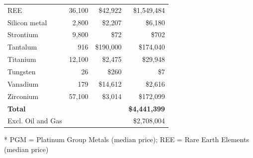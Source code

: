 \documentclass{adonis}
\begin{document}
\begin{table}[H]
\begin{threeparttable}
\begin{tabular}{@{}l@{\hskip 6pt}r@{\hskip 6pt}r@{\hskip 6pt}r@{}}
REE\tnote{*}       & 36,100                 & \$42,922         & \$1,549,484 \\
Silicon metal      & 2,800                  & \$2,207          & \$6,180 \\
Strontium          & 9,800                  & \$72             & \$702 \\
Tantalum           & 916                    & \$190,000        & \$174,040 \\
Titanium           & 12,100                 & \$2,475          & \$29,948 \\
Tungsten           & 26                     & \$260            & \$7 \\
Vanadium           & 179                    & \$14,612         & \$2,616 \\
Zirconium          & 57,100                 & \$3,014          & \$172,099 \\
\midrule
\textbf{Total}     &                        &                  & \textbf{\$4,441,399} \\
Excl. Oil and Gas  &                        &                  & \$2,708,004 \\
\bottomrule
\end{tabular}
\begin{tablenotes}
\footnotesize
\item[*] PGM = Platinum Group Metals (median price); REE = Rare Earth Elements (median price)\\
\end{tablenotes}
\end{threeparttable}
\end{table}
\end{document}

